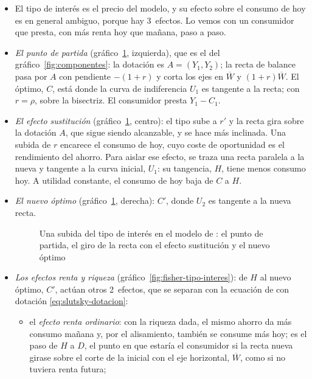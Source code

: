 \documentclass[11pt]{article}
\begin{document}
\begin{itemize}
\item El tipo de interés es el precio del modelo, y su efecto sobre el consumo de hoy es en general ambiguo, porque hay 3~efectos\nocite{ObstfeldRogoff1996Foundations}. Lo vemos con un consumidor que presta, con más renta hoy que mañana, paso a paso.
\item \emph{El punto de partida} (gráfico~\ref{fig:fisher-tipo-interes-pasos}, izquierda), que es el del gráfico~\ref{fig:componentes}: la dotación es $A=(Y_1,Y_2)$; la recta de balance pasa por $A$ con pendiente $-(1+r)$ y corta los ejes en $\overline W$ y $(1+r)\overline W$. El óptimo, $C$, está donde la curva de indiferencia $U_1$ es tangente a la recta; con $r=\rho$, sobre la bisectriz. El consumidor presta $Y_1-C_1$.
\item \emph{El efecto sustitución} (gráfico~\ref{fig:fisher-tipo-interes-pasos}, centro): el tipo sube a $r'$ y la recta gira sobre la dotación $A$, que sigue siendo alcanzable, y se hace más inclinada. Una subida de $r$ encarece el consumo de hoy, cuyo coste de oportunidad es el rendimiento del ahorro. Para aislar ese efecto, se traza una recta paralela a la nueva y tangente a la curva inicial, $U_1$: su tangencia, $H$, tiene menos consumo hoy. A utilidad constante, el consumo de hoy baja de $C$ a $H$.
\item \emph{El nuevo óptimo} (gráfico~\ref{fig:fisher-tipo-interes-pasos}, derecha): $C'$, donde $U_2$ es tangente a la nueva recta.
  \begin{figure}[H]
  \centering
  \caption{Una subida del tipo de interés en el modelo de : el punto de partida, el giro de la recta con el efecto sustitución y el nuevo óptimo}\label{fig:fisher-tipo-interes-pasos}
  \hfill
  \hfill
  \end{figure}
\item \emph{Los efectos renta y riqueza} (gráfico~\ref{fig:fisher-tipo-interes}): de $H$ al nuevo óptimo, $C'$, actúan otros 2~efectos, que se separan con la ecuación de  con dotación \eqref{eq:slutsky-dotacion}:
  \begin{itemize}
  \item el \emph{efecto renta ordinario}: con la riqueza dada, el mismo ahorro da más consumo mañana y, por el alisamiento, también se consume más hoy; es el paso de $H$ a $D$, el punto en que estaría el consumidor si la recta nueva girase sobre el corte de la inicial con el eje horizontal, $\overline W$, como si no tuviera renta futura\nocite{Heijdra2009Foundations};

\end{itemize}
\end{itemize}
\end{document}
